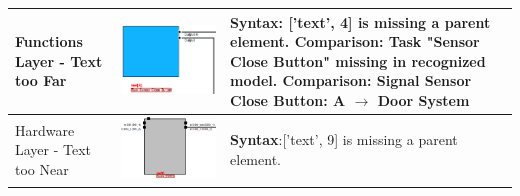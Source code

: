 \begin{longtable}{p{} >{\raggedright\arraybackslash}m{} >{\raggedright\arraybackslash}m{}}
    \midrule
    Functions Layer - Text too Far & \includegraphics[width=\linewidth]{pictures/60_text_too_far_output_clip.png} & \textbf{Syntax}: ['text', 4] is missing a parent element. \newline
        \textbf{Comparison}: Task "Sensor Close Button" missing in recognized model. \newline
        \textbf{Comparison}: Signal Sensor Close Button: A $\rightarrow$ Door System \\
    \midrule
    Hardware Layer - Text too Near & \includegraphics[width=\linewidth]{pictures/61_text_too_far_output_clip.png} & \textbf{Syntax}:['text', 9] is missing a parent element. \\
\end{longtable}

